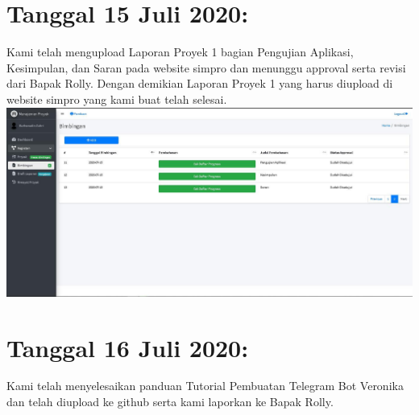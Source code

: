 \documentclass{article}
\begin{document}
\section{Tanggal 15 Juli 2020:}
Kami telah mengupload Laporan Proyek 1 bagian Pengujian Aplikasi, Kesimpulan, dan Saran pada website simpro dan menunggu approval serta revisi dari Bapak Rolly. Dengan demikian Laporan Proyek 1 yang harus diupload di website simpro yang kami buat telah selesai.
	\newline
	\includegraphics[scale=0.4]{6.jpg}
	\newline

\section{Tanggal 16 Juli 2020:}
Kami telah menyelesaikan panduan Tutorial Pembuatan Telegram Bot Veronika dan telah diupload ke github serta kami laporkan ke Bapak Rolly.
	\newline
	\newline
	
\end{document}

